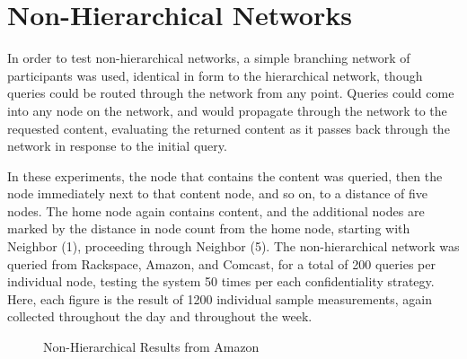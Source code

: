 \section{Non-Hierarchical Networks}
In order to test non-hierarchical networks, a simple branching network of participants was used, identical in form to the hierarchical network, though queries could be routed through the network from any point.  Queries could come into any node on the network, and would propagate through the network to the requested content, evaluating the returned content as it passes back through the network in response to the initial query.

In these experiments, the node that contains the content was queried, then the node immediately next to that content node, and so on, to a distance of five nodes.  The home node again contains content, and the additional nodes are marked by the distance in node count from the home node, starting with Neighbor (1), proceeding through Neighbor (5).  The non-hierarchical network was queried from Rackspace, Amazon, and Comcast, for a total of 200 queries per individual node, testing the system 50 times per each confidentiality strategy.  Here, each figure is the result of 1200 individual sample measurements, again collected throughout the day and throughout the week.


\begin{figure}[htbp]
\begin{minipage}[b]{0.5\linewidth}
\centering
{}
\end{minipage}
\begin{minipage}[b]{0.5\linewidth}
\centering
{}
\end{minipage}
\caption{Non-Hierarchical Results from Amazon}
\label{fig:model:nh-amazon-results}
\end{figure}

